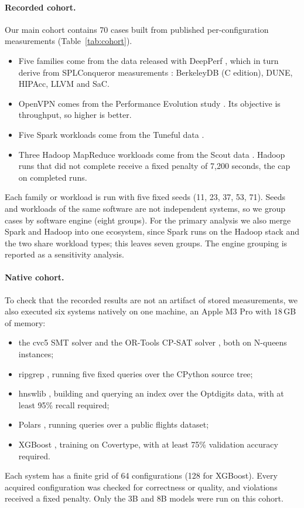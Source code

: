 \paragraph{Recorded cohort.} Our main cohort contains 70 cases built from published per-configuration measurements (Table~\ref{tab:cohort}).
\begin{itemize}
  \item Five families come from the data released with DeepPerf \cite{ha2019deepperf}, which in turn derive from SPLConqueror measurements \cite{siegmund2015influence}: BerkeleyDB (C edition), DUNE, HIPAcc, LLVM and SaC.
  \item OpenVPN comes from the Performance Evolution study \cite{kaltenecker2023evolution}. Its objective is throughput, so higher is better.
  \item Five Spark workloads come from the Tuneful data \cite{fekry2020tuneful}.
  \item Three Hadoop MapReduce workloads come from the Scout data \cite{hsu2018scout}. Hadoop runs that did not complete receive a fixed penalty of 7,200 seconds, the cap on completed runs.
\end{itemize}
Each family or workload is run with five fixed seeds (11, 23, 37, 53, 71). Seeds and workloads of the same software are not independent systems, so we group cases by software engine (eight groups). For the primary analysis we also merge Spark and Hadoop into one ecosystem, since Spark runs on the Hadoop stack and the two share workload types; this leaves seven groups. The engine grouping is reported as a sensitivity analysis.

\paragraph{Native cohort.} To check that the recorded results are not an artifact of stored measurements, we also executed six systems natively on one machine, an Apple M3 Pro with 18\,GB of memory:
\begin{itemize}
  \item the cvc5 SMT solver \cite{barbosa2022cvc5} and the OR-Tools CP-SAT solver \cite{perron2023ortools}, both on N-queens instances;
  \item ripgrep \cite{gallant2016ripgrep}, running five fixed queries over the CPython source tree;
  \item hnswlib \cite{malkov2020hnsw}, building and querying an index over the Optdigits data, with at least 95\% recall required;
  \item Polars \cite{vink2020polars}, running queries over a public flights dataset;
  \item XGBoost \cite{chen2016xgboost}, training on Covertype, with at least 75\% validation accuracy required.
\end{itemize}
Each system has a finite grid of 64 configurations (128 for XGBoost). Every acquired configuration was checked for correctness or quality, and violations received a fixed penalty. Only the 3B and 8B models were run on this cohort.

